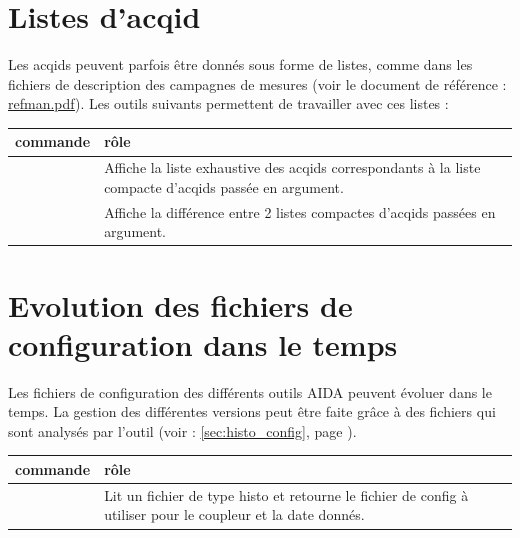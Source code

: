 \section{Listes d'acqid}
Les acqids peuvent parfois être donnés sous forme de listes, comme dans les
fichiers de description des campagnes de mesures (voir le document de
référence : \url{refman.pdf}).
Les outils suivants permettent de  travailler avec ces listes :

\begin{center}
\tablefirsthead{}
\tabletail{\hline}
\tablelasttail{}

\begin{supertabular}{|p{6cm}|p{9cm}|}
\hline
\textbf{commande} &
\textbf{rôle}
\\ \hline

 &
Affiche la liste exhaustive des acqids correspondants à la liste compacte
d'acqids passée en argument.
\\ \hline

 &
Affiche la différence entre 2 listes compactes d'acqids passées en argument.
\\ \hline

\end{supertabular}
\end{center}


\section{Evolution des fichiers de configuration dans le temps}
Les fichiers de configuration des différents outils AIDA peuvent évoluer dans
le temps. La gestion des différentes versions peut être faite grâce à des
fichiers  qui sont analysés par l'outil 
(voir : \ref{sec:histo_config}, page \pageref{sec:histo_config}).

\begin{center}
\tablefirsthead{}
\tabletail{\hline}
\tablelasttail{}

\begin{supertabular}{|p{6cm}|p{9cm}|}
\hline
\textbf{commande} &
\textbf{rôle}
\\ \hline

 &
Lit un fichier de type histo et retourne le fichier de config à utiliser pour
le coupleur et la date donnés.
\\ \hline

\end{supertabular}
\end{center}


